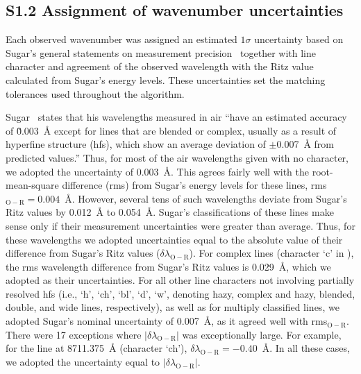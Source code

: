 \documentclass[10pt]{article}
\begin{document}
\subsection*{S1.2 Assignment of wavenumber uncertainties}
\label{ssec:unc}
Each observed wavenumber was assigned an estimated $1\sigma$ uncertainty
based on Sugar's general statements on measurement precision~\cite{Sugar1969,Sugar1974}
together with line character and agreement of the observed wavelength with the Ritz value
calculated from Sugar's energy levels. These
uncertainties set the matching tolerances used throughout the algorithm.

Sugar~\cite{Sugar1974} states that his wavelengths measured in air
``have an estimated accuracy of \~0.003~{\AA} except for lines that are 
blended or complex, usually as a result of hyperfine structure (hfs), which 
show an average deviation of $\pm$0.007~{\AA} from predicted values.''
Thus, for most of the air wavelengths given with no character, we adopted the uncertainty 
of 0.003~{\AA}. This agrees fairly well with the root-mean-square difference (rms) 
from Sugar's energy levels for these lines, rms$_{\mathrm{O}-\mathrm{R}} = 0.004$~{\AA}. However, several tens 
of such wavelengths deviate from Sugar's Ritz values by 0.012~{\AA} to 0.054~{\AA}.
Sugar's classifications of these lines make sense only if their measurement 
uncertainties were greater than average. Thus, for these wavelengths we adopted 
uncertainties equal to the absolute value of their difference from Sugar's Ritz values ($\delta\lambda_{\mathrm{O}-\mathrm{R}}$).
For complex lines (character `c' in \cite{Sugar1974}), the rms wavelength difference from 
Sugar's Ritz values is 0.029~{\AA}, which we adopted as their uncertainties.
For all other line characters not involving partially resolved hfs 
(i.e., `h', `ch', `bl', `d', `w', denoting hazy, complex and hazy, blended, double,
and wide lines, respectively), as well as for multiply classified lines, we adopted 
Sugar's nominal uncertainty of 0.007~{\AA}, as it agreed well with rms$_{\mathrm{O}-\mathrm{R}}$.
There were 17 exceptions where $\vert\delta\lambda_{\mathrm{O}-\mathrm{R}}\vert$ was 
exceptionally large. For example, for the line at 8711.375~{\AA} (character `ch'), 
$\delta\lambda_{\mathrm{O}-\mathrm{R}} = -0.40$~{\AA}.
In all these cases, we adopted the uncertainty equal to $\vert\delta\lambda_{\mathrm{O}-\mathrm{R}}\vert$.
\end{document}
